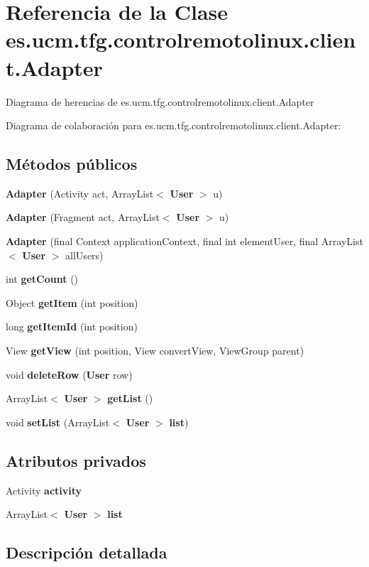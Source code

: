 \section{Referencia de la Clase es.\-ucm.\-tfg.\-controlremotolinux.\-client.\-Adapter}
\label{classes_1_1ucm_1_1tfg_1_1controlremotolinux_1_1client_1_1Adapter}


Diagrama de herencias de es.\-ucm.\-tfg.\-controlremotolinux.\-client.\-Adapter


Diagrama de colaboración para es.\-ucm.\-tfg.\-controlremotolinux.\-client.\-Adapter\-:
\subsection*{Métodos públicos}
\begin{DoxyCompactItemize}
\item 
{\bf Adapter} (Activity act, Array\-List$<$ {\bf User} $>$ u)
\item 
{\bf Adapter} (Fragment act, Array\-List$<$ {\bf User} $>$ u)
\item 
{\bf Adapter} (final Context application\-Context, final int element\-User, final Array\-List$<$ {\bf User} $>$ all\-Users)
\item 
int {\bf get\-Count} ()
\item 
Object {\bf get\-Item} (int position)
\item 
long {\bf get\-Item\-Id} (int position)
\item 
View {\bf get\-View} (int position, View convert\-View, View\-Group parent)
\item 
void {\bf delete\-Row} ({\bf User} row)
\item 
Array\-List$<$ {\bf User} $>$ {\bf get\-List} ()
\item 
void {\bf set\-List} (Array\-List$<$ {\bf User} $>$ {\bf list})
\end{DoxyCompactItemize}
\subsection*{Atributos privados}
\begin{DoxyCompactItemize}
\item 
Activity {\bf activity}
\item 
Array\-List$<$ {\bf User} $>$ {\bf list}
\end{DoxyCompactItemize}


\subsection{Descripción detallada}


